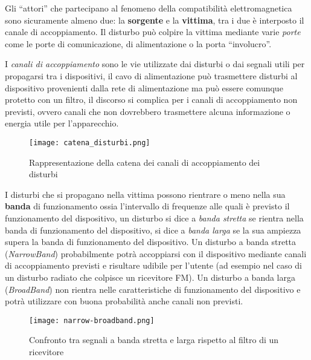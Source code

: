 Gli ``attori'' che partecipano al fenomeno della compatibilità elettromagnetica sono sicuramente
almeno due: la \textbf{sorgente} e la \textbf{vittima}, tra i due è interposto il canale di accoppiamento.
Il disturbo può colpire la vittima mediante varie \textit{porte} come le porte di comunicazione,
di alimentazione o la porta ``involucro''.

I \textit{canali di accoppiamento} sono le vie utilizzate dai disturbi o dai segnali utili per propagarsi tra i 
dispositivi, il cavo di alimentazione può trasmettere disturbi al dispositivo provenienti dalla rete di alimentazione
ma può essere comunque protetto con un filtro, il discorso si complica per i canali di accoppiamento non previsti,
ovvero canali che non dovrebbero trasmettere alcuna informazione o energia utile per l'apparecchio.

\begin{figure}[h]
 \texttt{[image: catena\_disturbi.png]}
 \centering
 \caption{Rappresentazione della catena dei canali di accoppiamento dei disturbi}
 \label{fig:catena_disturbi}
\end{figure}

I disturbi che si propagano nella vittima possono rientrare o meno nella sua \textbf{banda} di funzionamento
ossia l'intervallo di frequenze alle quali è previsto il funzionamento del dispositivo, un disturbo si dice
a \textit{banda stretta} se rientra nella banda di funzionamento del dispositivo, si dice a \textit{banda larga}
se la sua ampiezza supera la banda di funzionamento del dispositivo.
Un disturbo a banda stretta (\textit{NarrowBand}) probabilmente potrà accoppiarsi con il dispositivo mediante
canali di accoppiamento previsti e risultare udibile per l'utente (ad esempio nel caso di un disturbo radiato che colpisce
un ricevitore FM).
Un disturbo a banda larga (\textit{BroadBand}) non rientra nelle caratteristiche di funzionamento del dispositivo
e potrà utilizzare con buona probabilità anche canali non previsti.
\begin{figure}[h]
 \texttt{[image: narrow-broadband.png]}
 \centering
 \caption{Confronto tra segnali a banda stretta e larga rispetto al filtro di un ricevitore}
 \label{fig:narrow-broadband}
\end{figure}







